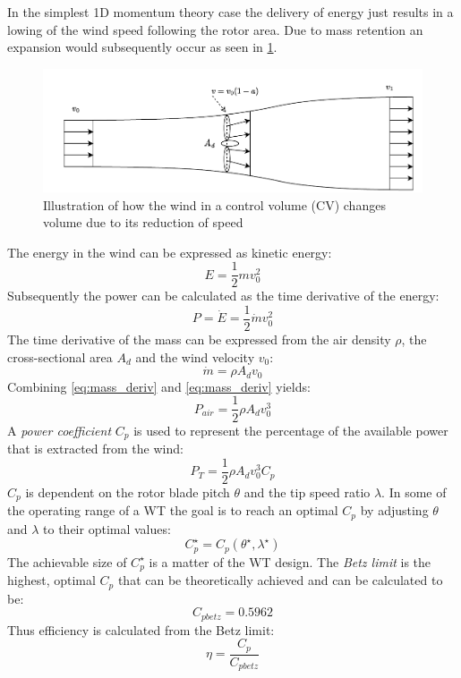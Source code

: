 In the simplest 1D momentum theory case the delivery of energy just results in a lowing of the wind speed following the rotor area. Due to mass retention an expansion would subsequently occur as seen in \cref{fig:betz}.
\begin{figure}[h]
	\centering
	\includegraphics[width=0.8\linewidth]{Graphics/FlowThroughRotor.pdf}
	\caption{Illustration of how the wind in a control volume (CV) changes volume due to its reduction of speed}
	\label{fig:betz}
\end{figure}
The energy in the wind can be expressed as kinetic energy:
\begin{equation} \label{eq:energy}
	E = \dfrac{1}{2} m v_0^2
\end{equation}
Subsequently the power can be calculated as the time derivative of the energy:
\begin{equation} \label{eq:power}
	P = \dot{E} = \dfrac{1}{2} \dot{m} v_0^2
\end{equation}
The time derivative of the mass can be expressed from the air density $ \rho $, the cross-sectional area $ A_d $ and the wind velocity $ v_0 $:
\begin{equation}\label{eq:mass_deriv}
	\dot{m} = \rho A_d v_0
\end{equation}
Combining \cref{eq:mass_deriv} and \cref{eq:mass_deriv} yields:
\begin{equation}\label{eq:power2}
	P_{air} = \dfrac{1}{2} \rho A_d v_0^3
\end{equation}
A \textit{power coefficient} $ C_p $ is used to represent the percentage of the available power that is extracted from the wind:
\begin{equation}\label{eq:power_w_Cp}
	P_{T} = \dfrac{1}{2} \rho A_d v_0^3 C_p
\end{equation}
$ C_p $ is dependent on the rotor blade pitch $ \theta $ and the tip speed ratio $ \lambda $. In some of the operating range of a WT the goal is to reach an optimal $ C_p $ by adjusting $ \theta $ and  $ \lambda $ to their optimal values:
\begin{equation}\label{eq:cp_optimal}
	C_p^\star = C_p(\theta^\star, \lambda^\star)
\end{equation}
 The achievable size of $ C_p^\star $ is a matter of the WT design. The \textit{Betz limit} is the highest, optimal $ C_p $ that can be theoretically achieved and can be calculated to be:
\begin{equation}\label{eq:betzlimit}
	C_{pbetz} = 0.5962
\end{equation}
Thus efficiency is calculated from the Betz limit:
\begin{equation}\label{eq:efficiency}
	\eta = \dfrac{C_p}{C_{pbetz}}
\end{equation}

